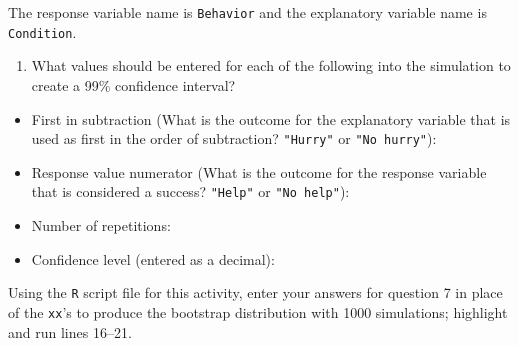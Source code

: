 \documentclass[
]{report}
\providecommand{\tightlist}{%
  \setlength{\itemsep}{0pt}\setlength{\parskip}{0pt}}
\begin{document}
The response variable name is \texttt{Behavior} and the explanatory variable name is \texttt{Condition}.

\begin{enumerate}
\def\labelenumi{\arabic{enumi}.}
\setcounter{enumi}{6}
\tightlist
\item
  What values should be entered for each of the following into the simulation to create a 99\% confidence interval?
  \vspace{.5mm}
\end{enumerate}

\begin{itemize}
\tightlist
\item
  First in subtraction (What is the outcome for the explanatory variable that is used as first in the order of subtraction? \texttt{"Hurry"} or \texttt{"No\ hurry"}):
\end{itemize}

\vspace{.15in}

\begin{itemize}
\tightlist
\item
  Response value numerator (What is the outcome for the response variable that is considered a success? \texttt{"Help"} or \texttt{"No\ help"}):
\end{itemize}

\vspace{.15in}

\begin{itemize}
\tightlist
\item
  Number of repetitions:
\end{itemize}

\vspace{.15in}

\begin{itemize}
\tightlist
\item
  Confidence level (entered as a decimal):
\end{itemize}

\vspace{.15in}

Using the \texttt{R} script file for this activity, enter your answers for question 7 in place of the \texttt{xx}'s to produce the bootstrap distribution with 1000 simulations; highlight and run lines 16--21.
\end{document}
